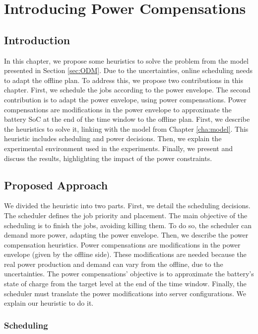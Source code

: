 \chapter{Introducing Power Compensations}
\label{cha:power_compensations}

\minitoc

\section{Introduction}

In this chapter, we propose some heuristics to solve the problem from the model presented in Section \ref{sec:ODM}. Due to the uncertainties, online scheduling needs to adapt the offline plan. To address this, we propose two contributions in this chapter. First, we schedule the jobs according to the power envelope. The second contribution is to adapt the power envelope, using power compensations. Power compensations are modifications in the power envelope to approximate the battery SoC at the end of the time window to the offline plan. First, we describe the heuristics to solve it, linking with the model from Chapter \ref{cha:model}. This heuristic includes scheduling and power decisions. Then, we explain the experimental environment used in the experiments. Finally, we present and discuss the results, highlighting the impact of the power constraints.

\section{Proposed Approach}

We divided the heuristic into two parts. First, we detail the scheduling decisions. The scheduler defines the job priority and placement. The main objective of the scheduling is to finish the jobs, avoiding killing them. To do so, the scheduler can demand more power, adapting the power envelope. Then, we describe the power compensation heuristics. Power compensations are modifications in the power envelope (given by the offline side). These modifications are needed because the real power production and demand can vary from the offline, due to the uncertainties. The power compensations' objective is to approximate the battery's state of charge from the target level at the end of the time window. Finally, the scheduler must translate the power modifications into server configurations. We explain our heuristic to do it.

\subsection{Scheduling}
\label{sec:heuristic_scheduling}

